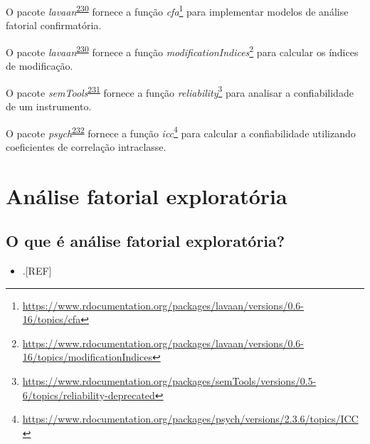 \documentclass[
  a4paper,
]{book}
\providecommand{\tightlist}{%
  \setlength{\itemsep}{0pt}\setlength{\parskip}{0pt}}
\renewcommand{\href}[2]{#2\footnote{\url{#1}}}
\newenvironment{infobox}[1]
  {
  \begin{itemize}
  \renewcommand{\labelitemi}{
    \raisebox{-.7\height}[0pt][0pt]{
      {\setkeys{Gin}{width=3em,keepaspectratio}
        \texttt{[image: \#1]}}
    }
  }
  \setlength{\fboxsep}{1em}
  \begin{blackbox}
  \item
  }
  {
  \end{blackbox}
  \end{itemize}
  }
\begin{document}
\begin{infobox}{images/Rlogo}
O pacote \emph{lavaan}\textsuperscript{\protect\hyperlink{ref-lavaan}{230}} fornece a função \href{https://www.rdocumentation.org/packages/lavaan/versions/0.6-16/topics/cfa}{\emph{cfa}} para implementar modelos de análise fatorial confirmatória.

\end{infobox}

\begin{infobox}{images/Rlogo}
O pacote \emph{lavaan}\textsuperscript{\protect\hyperlink{ref-lavaan}{230}} fornece a função \href{https://www.rdocumentation.org/packages/lavaan/versions/0.6-16/topics/modificationIndices}{\emph{modificationIndices}} para calcular os índices de modificação.

\end{infobox}

\begin{infobox}{images/Rlogo}
O pacote \emph{semTools}\textsuperscript{\protect\hyperlink{ref-semTools}{231}} fornece a função \href{https://www.rdocumentation.org/packages/semTools/versions/0.5-6/topics/reliability-deprecated}{\emph{reliability}} para analisar a confiabilidade de um instrumento.

\end{infobox}

\begin{infobox}{images/Rlogo}
O pacote \emph{psych}\textsuperscript{\protect\hyperlink{ref-psych-2}{232}} fornece a função \href{https://www.rdocumentation.org/packages/psych/versions/2.3.6/topics/ICC}{\emph{icc}} para calcular a confiabilidade utilizando coeficientes de correlação intraclasse.

\end{infobox}

\hypertarget{analise-fatorial-exploratoria}{%
\section{Análise fatorial exploratória}\label{analise-fatorial-exploratoria}}

\hypertarget{o-que-uxe9-anuxe1lise-fatorial-exploratuxf3ria}{%
\subsection{O que é análise fatorial exploratória?}\label{o-que-uxe9-anuxe1lise-fatorial-exploratuxf3ria}}

\begin{itemize}
\tightlist
\item
  .{[}REF{]}
\end{itemize}
\end{document}
